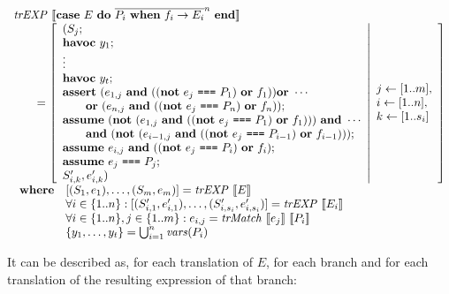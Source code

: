 \[
\begin{array}{l}
\mathit{trEXP}~\llbracket\textbf{case}~E~\textbf{do}~\overline{P_i~\textbf{when}~f_i \rightarrow E_i}^n~\textbf{end}\rrbracket\\
\qquad = \left[ \begin{array}{l}
(S_j;\\
\textbf{havoc}~y_{1};\\
\vdots\\
\textbf{havoc}~y_{t};\\
\textbf{assert}~(e_{1,j}~\textbf{and}~((\textbf{not}~e_j~\texttt{===}~P_1)~\textbf{or}~f_1))\textbf{or}~\cdots\\
\quad\quad\textbf{or}~(e_{n,j}~\textbf{and}~((\textbf{not}~e_j~\texttt{===}~P_n)~\textbf{or}~f_n)); \\
\textbf{assume}~(\textbf{not}~(e_{1,j}~\textbf{and}~((\textbf{not}~e_j~\texttt{===}~P_1)~\textbf{or}~f_1)))~\textbf{and}~\cdots\\
\quad\quad\textbf{and}~(\textbf{not}~(e_{i-1,j}~\textbf{and}~((\textbf{not}~e_j~\texttt{===}~P_{i - 1})~\textbf{or}~f_{i - 1}))); \\
\textbf{assume}~e_{i,j}~\textbf{and}~((\textbf{not}~e_j~\texttt{===}~P_{i})~\textbf{or}~f_{i});\\
\textbf{assume}~e_j~\texttt{===}~P_j; \\
S_{i,k}', e_{i,k}')
\end{array}  \middle\vert
\begin{array}{l}
j \leftarrow [1..m], \\
i \leftarrow [1..n], \\
k \leftarrow [1..s_i] \\
\end{array}
\right]\\
\begin{array}{ll}
\textbf{where} & [(S_1,e_1),\ldots,(S_m,e_m)] = \mathit{trEXP}~\llbracket E\rrbracket \\
& \forall i \in \{1..n\}: [(S'_{i,1},e'_{i,1}),\ldots,(S'_{i,s_i},e'_{i,s_i})] = \mathit{trEXP}~\llbracket E_i\rrbracket \\
& \forall i \in \{1..n\}, j \in \{1..m\}: e_{i,j} = \mathit{trMatch}~\llbracket e_j\rrbracket~\llbracket P_i\rrbracket \\
& \{y_{1}, \ldots, y_{t}\} = \bigcup_{i = 1}^n\mathit{vars}(P_i) \\
\end{array}
\end{array}
\]

It can be described as, for each translation of $E$, for each branch and for 
each translation of the resulting expression of that branch:

